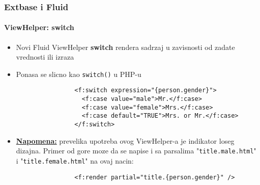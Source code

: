 \begin{frame}[fragile]
	\frametitle{Extbase i Fluid}
	\framesubtitle{ViewHelper: switch}

	\lstset{
		basicstyle=\smaller\ttfamily
	}

	\begin{itemize}
		\item Novi Fluid ViewHelper \textbf{switch} rendera sadrzaj u zavisnosti od zadate vrednosti ili izraza
		\item Ponasa se slicno kao \texttt{switch()} u PHP-u

			\begin{lstlisting}
				<f:switch expression="{person.gender}">
				  <f:case value="male">Mr.</f:case>
				  <f:case value="female">Mrs.</f:case>
				  <f:case default="TRUE">Mrs. or Mr.</f:case>
				</f:switch>
			\end{lstlisting}

		\item \textbf{\underline{Napomena:}} prevelika upotreba ovog ViewHelper-a je indikator loseg dizajna. Primer od gore moze da se napise i sa parsalima "\texttt{title.male.html}" i "\texttt{title.female.html}" na ovaj nacin:

			\begin{lstlisting}
				<f:render partial="title.{person.gender}" />
			\end{lstlisting}

	\end{itemize}

\end{frame}


